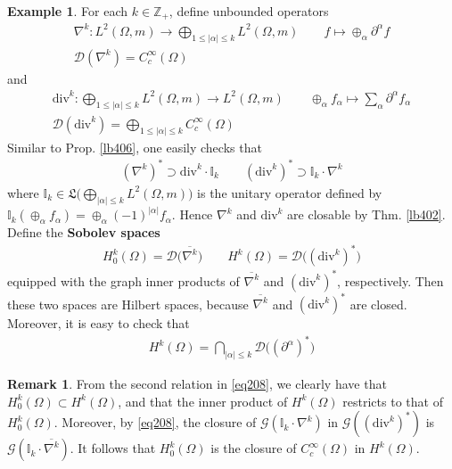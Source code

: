 \documentclass[12pt,b5paper,notitlepage]{article}
\theoremstyle{definition}
\newtheorem{eg}[df]{Example}
\newtheorem{rem}[df]{Remark}
\theoremstyle{plain}
\newcommand{\fk}{\mathfrak}
\newcommand{\ovl}{\overline}
\newcommand{\Dom}{\mathscr{D}}
\newcommand{\Zbb}{\mathbb Z}
\newcommand{\Ibb}{\mathbb I}
\newcommand{\dive}{\mathrm{div}}
\newcommand{\SG}{\mathscr G}
\numberwithin{equation}{section}
\begin{document}
\begin{eg}
For each $k\in\Zbb_+$,  define unbounded operators
\begin{gather*}
\nabla^k:L^2(\Omega,m)\rightarrow \bigoplus_{1\leq|\alpha|\leq k}L^2(\Omega,m)\qquad f\mapsto\oplus_\alpha \partial^\alpha f\\
\Dom(\nabla^k)=C_c^\infty(\Omega)
\end{gather*}
and
\begin{gather*}
\dive^k:\bigoplus_{1\leq|\alpha|\leq k}L^2(\Omega,m)\rightarrow  L^2(\Omega,m)\qquad\oplus_\alpha f_\alpha\mapsto\sum_\alpha \partial^\alpha f_\alpha\\
\Dom(\dive^k)=\bigoplus_{1\leq|\alpha|\leq k}C_c^\infty(\Omega)
\end{gather*}
Similar to Prop. \ref{lb406}, one easily checks that
\begin{align}\label{eq208}
(\nabla^k)^*\supset \dive^k\cdot \Ibb_k\qquad (\dive^k)^*\supset \Ibb_k\cdot\nabla^k
\end{align}
where $\Ibb_k\in\fk L\big(\bigoplus_{|\alpha|\leq k}L^2(\Omega,m)\big)$ is the unitary operator defined by $\Ibb_k(\oplus_\alpha f_\alpha)=\oplus_\alpha (-1)^{|\alpha|}f_\alpha$. Hence $\nabla^k$ and $\dive^k$ are closable by Thm. \ref{lb402}. Define the  \textbf{Sobolev spaces} 
\begin{align*}
H^k_0(\Omega)=\Dom\big(\ovl{\nabla^k}\big)\qquad H^k(\Omega)=\Dom\big((\dive^k)^*\big)
\end{align*}
equipped with the graph inner products of $\ovl{\nabla^k}$ and $(\dive^k)^*$, respectively. Then these two spaces are Hilbert spaces, because $\ovl{\nabla^k}$ and $(\dive^k)^*$ are closed. Moreover, it is easy to check that
\begin{align*}
H^k(\Omega)=\bigcap_{|\alpha|\leq k}\Dom\big((\partial^\alpha)^*\big)
\end{align*}
\end{eg}



\begin{rem}
From the second relation in \eqref{eq208}, we clearly have that $H^k_0(\Omega)\subset H^k(\Omega)$, and that the inner product of $H^k(\Omega)$ restricts to that of $H^k_0(\Omega)$. Moreover, by \eqref{eq208}, the closure of $\SG(\Ibb_k\cdot\nabla^k)$ in $\SG((\dive^k)^*)$ is $\SG(\Ibb_k\cdot\ovl{\nabla^k})$. It follows that $H^k_0(\Omega)$ is the closure of $C_c^\infty(\Omega)$ in $H^k(\Omega)$. 
\end{rem}
\end{document}
